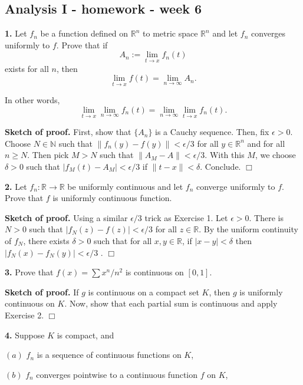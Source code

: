\documentclass{article}
\begin{document}
    
    
    
    
    

    
    \subsection*{Analysis I - homework - week
6}\label{analysis-i---homework---week-6}

    \textbf{1.} Let $f_n$ be a function defined on $\mathbb{R}^n$ to metric
space $\mathbb{R}^n$ and let $f_n$ converges uniformly to $f$. Prove
that if \[
A_n := \lim_{t\to x}f_n(t)
\] exists for all $n$, then \[
\lim_{t\to x}f(t) = \lim_{n\to\infty}A_n.\]

In other words,
\[ \lim_{t\to x}\lim_{n\to\infty} f_n(t) = \lim_{n\to \infty}\lim_{t\to x}f_n(t).\]

\textbf{Sketch of proof.} First, show that $\{A_n\}$ is a Cauchy
sequence. Then, fix $\epsilon > 0$. Choose $N\in\mathbb{N}$ such that
$\|f_n(y) -f(y)\| < \epsilon/3$ for all $y\in \mathbb{R}^n$ and for all
$n\ge N$. Then pick $M > N$ such that $\|A_M - A\| < \epsilon/3$. With
this $M$, we choose $\delta > 0$ such that $|f_M(t) - A_M| < \epsilon/3$
if $\|t-x\| < \delta$. Conclude. $\Box$

    \textbf{2.} Let $f_n:\mathbb{R}\to \mathbb{R}$ be uniformly continuous
and let $f_n$ converge uniformly to $f$. Prove that $f$ is uniformly
continuous function.

\textbf{Sketch of proof.} Using a similar $\epsilon/3$ trick as Exercise
1. Let $\epsilon > 0$. There is $N>0$ such that
$|f_N(z) - f(z)| < \epsilon /3$ for all $z\in \mathbb{R}$. By the
uniform continuity of $f_N$, there exists $\delta > 0$ such that for all
$x,y \in \mathbb{R}$, if $|x-y| < \delta$ then
$|f_N(x) - f_N(y)| < \epsilon /3$ . $\Box$

    \textbf{3.} Prove that $f(x) = \sum x^n/n^2$ is continuous on $[0,1]$.

\textbf{Sketch of proof.} If $g$ is continuous on a compact set $K$,
then $g$ is uniformly continuous on $K$. Now, show that each partial sum
is continuous and apply Exercise 2. $\Box$

    \textbf{4.} Suppose $K$ is compact, and

$(a)$ $f_n$ is a sequence of continuous functions on $K$,

$(b)$ $f_n$ converges pointwise to a continuous function $f$ on $K$,
\end{document}

